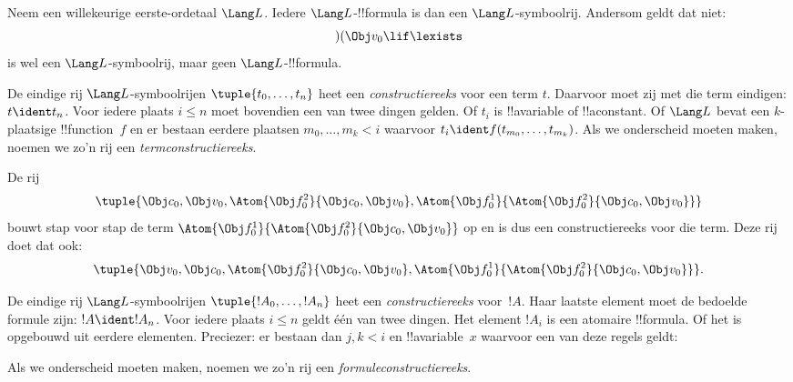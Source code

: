 \documentclass[openany]{memoir}
\begin{document}
\begin{ex}
Neem een willekeurige eerste-ordetaal $\Lang L$. Iedere
$\Lang L$-!!{formula} is dan een $\Lang L$-symboolrij. Andersom geldt
dat niet: \[)(\Obj v_0\lif\lexists\] is wel een
$\Lang L$-symboolrij, maar geen $\Lang L$-!!{formula}.
\end{ex}

\begin{defn}
De eindige rij $\Lang L$-symboolrijen $\tuple{t_0,\dotsc,t_n}$ heet een
\emph{constructiereeks} voor een term $t$. Daarvoor moet zij met die
term eindigen: $t \ident t_n$. Voor iedere plaats $i \leq n$ moet bovendien een van
twee dingen gelden. Of $t_i$ is !!a{variable} of !!a{constant}. Of
$\Lang L$ bevat een $k$-plaatsige !!{function}~$f$ en er
bestaan eerdere plaatsen $m_0,\dotsc,m_k < i$ waarvoor
$t_i \ident f(t_{m_0},\dotsc,t_{m_k})$. Als we onderscheid moeten
maken, noemen we zo'n rij een \emph{termconstructiereeks}.
\end{defn}

\begin{ex}
De rij
\[
    \tuple{\Obj c_0, \Obj v_0, \Atom{\Obj f^2_0}{\Obj c_0, \Obj v_0}, \Atom{\Obj f^1_0}{\Atom{\Obj f^2_0}{\Obj c_0, \Obj v_0}}}
\]
bouwt stap voor stap de term $\Atom{\Obj f^1_0}{\Atom{\Obj
f^2_0}{\Obj c_0, \Obj v_0}}$ op en is dus een constructiereeks voor
die term. Deze rij doet dat ook:
\[
    \tuple{\Obj v_0, \Obj c_0, \Atom{\Obj f^2_0}{\Obj c_0, \Obj v_0}, \Atom{\Obj f^1_0}{\Atom{\Obj f^2_0}{\Obj c_0, \Obj v_0}}}.
\]
\end{ex}

\begin{defn}
De eindige rij $\Lang L$-symboolrijen $\tuple{!A_0,\dotsc,!A_n}$
heet een \emph{constructiereeks} voor~$!A$. Haar laatste element moet
de bedoelde formule zijn: $!A \ident !A_n$. Voor iedere plaats
$i \leq n$ geldt één van twee dingen. Het element $!A_i$ is een
atomaire !!{formula}. Of het is opgebouwd uit eerdere elementen.
Preciezer: er bestaan dan $j,k < i$ en
!!a{variable}~$x$ waarvoor een van deze regels geldt:
\begin{enumerate}
\end{enumerate}
Als we onderscheid moeten maken, noemen we zo'n rij een
\emph{formuleconstructiereeks}.
\end{defn}
\end{document}

